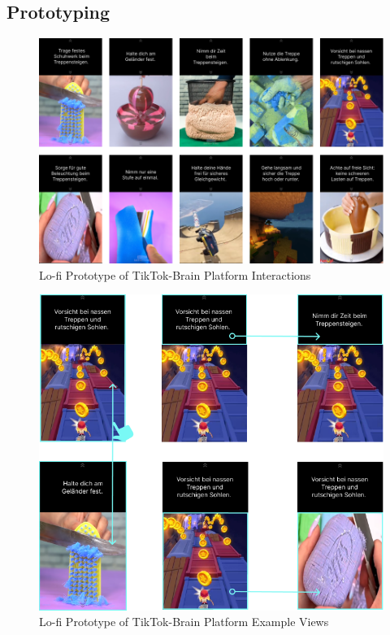 \documentclass{article}
\begin{document}
\subsection{Prototyping}

\begin{figure}[H]
    \centering
    \includegraphics[width=\textwidth]{./resources/storyboard.png}
    \caption{Lo-fi Prototype of TikTok-Brain Platform Interactions}
    \label{fig:storyboard}
\end{figure}

\begin{figure}[H]
    \centering
    \includegraphics[width=\textwidth]{./resources/full-system.png}
    \caption{Lo-fi Prototype of TikTok-Brain Platform Example Views}
    \label{fig:system-overview}
\end{figure}
\end{document}
